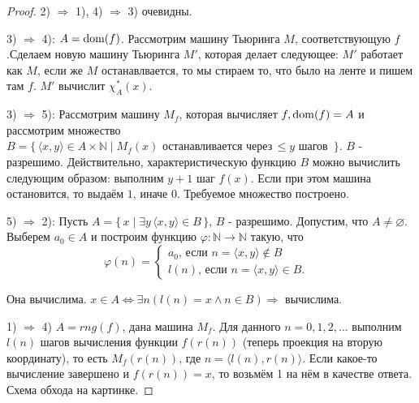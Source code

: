 \begin{proof}
	2) $\Rightarrow$ 1), 4) $\Rightarrow$ 3) очевидны.

	3) $\Rightarrow$ 4): $A=\operatorname{dom}(f)$. Рассмотрим машину Тьюринга $M$, соответствующую $f$.Сделаем новую машину
	Тьюринга $M'$, которая делает следующее: $M'$ работает как $M$, если же $M$ останавлвается, то мы стираем то,
	что было на ленте и пишем там $f$. $M'$ вычислит $\chi^*_{A}(x)$.

	3) $\Rightarrow$ 5): Рассмотрим машину $M_f$, которая вычисляет $f, \operatorname{dom}(f)=A$ и рассмотрим множество $B =
	\{\,\langle x,y\rangle\in A\times\mathbb{N}\mid M_{f}(x)\mbox{ останавливается через}\,\leqslant y\mbox{ шагов
	}\,\}$. $B$ - разрешимо. Действительно, характеристическую функцию $B$ можно вычислить следующим образом:
	выполним $y+1$ шаг $f(x)$. Если при этом машина остановится, то выдаём $1$, иначе $0$. Требуемое множество
	построено.

	5) $\Rightarrow$ 2): Пусть $A = \{\,x\mid \exists y\,\langle x,y\rangle \in B\,\}$, $B$ - разрешимо.
	Допустим, что $A\neq\varnothing$. Выберем $a_0\in A$ и построим функцию
	$\varphi: \mathbb{N} \to \mathbb{N}$ такую, что 
	\begin{equation*}
		\varphi(n) = 
		\begin{cases}
			a_{0}\text{, если }n=\langle x,y\rangle\notin B&\\
			l(n)\text{, если }n=\langle x,y\rangle \in B.&
		\end{cases}
	\end{equation*}

	Она вычислима. $x \in A \iff \exists n (l(n)=x \land n \in B) \Rightarrow$ вычислима.
	
	1) $\Rightarrow$ 4) $A = rng(f)$, дана машина $M_f$. Для данного $n=0,1,2,\ldots$ выполним $l(n)$ шагов
	вычисления функции $f(r(n))$ (теперь проекция на вторую координату), то есть $M_{f}(r(n))$, где $n = \langle l(n),
	r(n)\rangle$. Если какое-то вычисление завершено и $f(r(n))=x$, то возьмём 1 на нём в качестве
	ответа. Схема обхода на картинке.
\end{proof}
